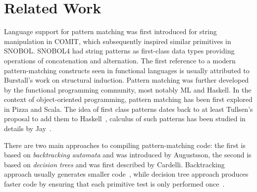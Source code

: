 \section{Related Work} %
\label{sec:rw}

Language support for pattern matching was first introduced for string manipulation 
in COMIT\cite{COMIT58}, which subsequently inspired similar primitives in 
SNOBOL\cite{SNOBOL64}. SNOBOL4 had string patterns as first-class data types 
providing operations of concatenation and alternation.
The first reference to a modern pattern-matching constructs seen in functional 
languages is usually attributed to Burstall's work on structural 
induction\cite{Burstall69provingproperties}. Pattern matching was further 
developed by the functional programming community, most notably 
ML\cite{ML78} and Haskell\cite{haskell90}. In the context of object-oriented programming, 
pattern matching has been first explored in Pizza\cite{Odersky97pizzainto} and 
Scala\cite{Scala2nd,EmirThesis}. The idea of first class patterns dates back to 
at least Tullsen's proposal to add them to Haskell~\cite{Tullsen00}, calculus of 
such patterns has been studied in details by Jay~\cite{Jay09,PatCalc09}.

There are two main approaches to compiling pattern-matching code: the first is 
based on \emph{backtracking automata} and was introduced by Augustsson\cite{Augustsson85}, 
the second is based on \emph{decision trees} and was first described by 
Cardelli\cite{Cardelli84}. %
Backtracking approach usually generates smaller code~\cite{OPM01}, while decision tree 
approach produces faster code by ensuring that each primitive test is only 
performed once~\cite{Maranget08}. %

